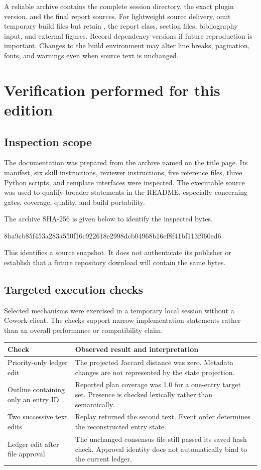 \documentclass[12pt,a4paper]{article}
\newcommand{\code}[1]{\texttt{\detokenize{#1}}}
\begin{document}
A reliable archive contains the complete session directory, the exact plugin version, and the final report sources. For lightweight source delivery, omit temporary build files but retain \code{references.tex}, the report class, section files, bibliography input, and external figures. Record dependency versions if future reproduction is important. Changes to the build environment may alter line breaks, pagination, fonts, and warnings even when source text is unchanged.

\section{Verification performed for this edition}
\subsection{Inspection scope}
The documentation was prepared from the archive named on the title page. Its manifest, six skill instructions, reviewer instructions, five reference files, three Python scripts, and template interfaces were inspected. The executable source was used to qualify broader statements in the README, especially concerning gates, coverage, quality, and build portability.

The archive SHA-256 is given below to identify the inspected bytes.
\begin{Code}
8ba9cb85f453a283a550f16c922618e2998dcb04968b16ef8f41bf113f960ed6
\end{Code}
This identifies a source snapshot. It does not authenticate its publisher or establish that a future repository download will contain the same bytes.

\subsection{Targeted execution checks}
Selected mechanisms were exercised in a temporary local session without a Cowork client. The checks support narrow implementation statements rather than an overall performance or compatibility claim.
\begin{longtable}{@{}P{49mm}P{110mm}@{}}
\toprule
Check & Observed result and interpretation\\
\midrule\endhead
Priority-only ledger edit & The projected Jaccard distance was zero. Metadata changes are not represented by the state projection.\\
Outline containing only an entry ID & Reported plan coverage was 1.0 for a one-entry target set. Presence is checked lexically rather than semantically.\\
Two successive text edits & Replay returned the second text. Event order determines the reconstructed entry state.\\
Ledger edit after file approval & The unchanged consensus file still passed its saved hash check. Approval identity does not automatically bind to the current ledger.\\
\bottomrule
\end{longtable}
\end{document}
